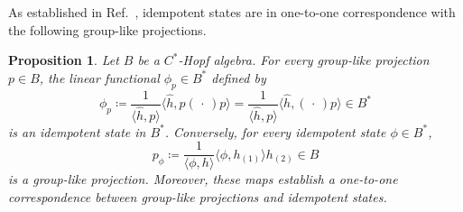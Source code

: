 \documentclass[a4paper,10pt]{amsart}
\newcommand{\eval}[2]{\langle #1 , #2\rangle}
\newcommand{\placeholder}{\,\cdot\,}
\newtheorem{proposition}[theorem]{Proposition}
\theoremstyle{definition}
\begin{document}
As established in Ref.~\cite{Franz_2009}, idempotent states are in one-to-one correspondence with the following group-like projections.
\begin{proposition}
\label{prop:phip}
    Let $B$ be a $C^*$-Hopf algebra.
	For every group-like projection $p \in B$, the linear functional $\phi_p \in B^*$ defined by
	\begin{equation}\label{eq:pTophi}
        \phi_p
        \coloneqq
        \frac{1}{\eval{\hat{h}}{p}}\eval{\hat{h}}{p (\placeholder) p}
        =
        \frac{1}{\eval{\hat{h}}{p}}\eval{\hat{h}}{(\placeholder) p}
        \in B^*
	\end{equation}
    is an idempotent state in $B^*$.
	Conversely, for every idempotent state $\phi \in B^*$,
	\begin{equation}\label{eq:phiTop}
		p_\phi
        \coloneqq
        \frac{1}{\eval{\phi}{h}}
            \eval{\phi}{h_{(1)}}
                h_{(2)}
        \in B
	\end{equation}
	is a group-like projection. Moreover, these maps establish a one-to-one correspondence between group-like projections and idempotent states.
\end{proposition}
\end{document}
